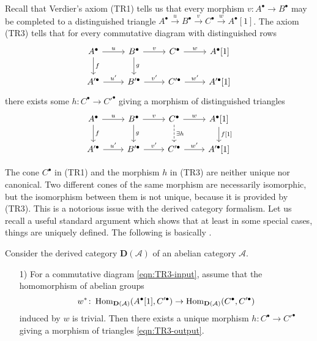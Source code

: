 \documentclass{article}
\numberwithin{equation}{section}
\begin{document}
\begin{appendices}
Recall that Verdier's axiom (TR1) tells us that every morphism
$v\colon A^\bullet \to B^\bullet$ may be completed to a distinguished triangle
$A^\bullet \xrightarrow{u} B^\bullet \xrightarrow{v} C^\bullet \xrightarrow{w} A^\bullet [1]$.
The axiom (TR3) tells that for every commutative diagram with
distinguished rows
\begin{equation}
  \label{eqn:TR3-input}
  \begin{tikzcd}
    A^\bullet\ar{r}{u}\ar{d}{f} & B^\bullet\ar{r}{v}\ar{d}{g} & C^\bullet\ar{r}{w} & A^\bullet [1] \\
    A'^\bullet\ar{r}{u'} & B'^\bullet\ar{r}{v'} & C'^\bullet\ar{r}{w'} & A'^\bullet [1]
  \end{tikzcd}
\end{equation}
there exists some $h\colon C^\bullet \to C'^\bullet$ giving a morphism of
distinguished triangles
\begin{equation}
  \label{eqn:TR3-output}
  \begin{tikzcd}
    A^\bullet\ar{r}{u}\ar{d}{f} & B^\bullet\ar{r}{v}\ar{d}{g} & C^\bullet\ar{r}{w}\ar[dashed]{d}{\exists h} & A^\bullet [1]\ar{d}{f [1]} \\
    A'^\bullet\ar{r}{u'} & B'^\bullet\ar{r}{v'} & C'^\bullet\ar{r}{w'} & A'^\bullet [1]
  \end{tikzcd}
\end{equation}

The cone $C^\bullet$ in (TR1) and the morphism $h$ in (TR3) are neither unique
nor canonical. Two different cones of the same morphism are necessarily
isomorphic, but the isomorphism between them is not unique, because it is
provided by (TR3). This is a notorious issue with the derived category
formalism. Let us recall a useful standard argument which shows that at least in
some special cases, things are uniquely defined. The following is basically
\cite[Proposition~1.1.9, Corollaire~1.1.10]{Beilinson-Bernstein-Deligne}.

\begin{lemma}
  \label{TR3-TR1-with-uniqueness-general-statement}

  Consider the derived category $\mathbf{D} (\mathcal{A})$ of an abelian
  category $\mathcal{A}$.

  \begin{enumerate}
  \item[1)] For a commutative diagram \eqref{eqn:TR3-input}, assume that the
    homomorphism of abelian groups
    \[ w^*\colon \operatorname{Hom}_{\mathbf{D} (\mathcal{A})} (A^\bullet [1], C'^\bullet) \to
    \operatorname{Hom}_{\mathbf{D} (\mathcal{A})} (C^\bullet, C'^\bullet) \]
    induced by $w$ is trivial. Then there exists a unique morphism
    $h\colon C^\bullet \to C'^\bullet$ giving a morphism of triangles
    \eqref{eqn:TR3-output}.


\end{enumerate}
\end{lemma}
\end{appendices}
\end{document}
